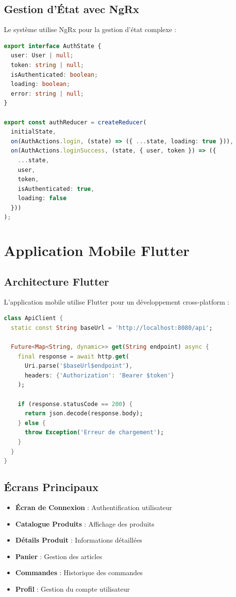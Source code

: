 \documentclass[12pt,a4paper]{report}
\begin{document}
\subsection{Gestion d'État avec NgRx}

Le système utilise NgRx pour la gestion d'état complexe :

\begin{lstlisting}[language=TypeScript, caption=Store NgRx pour l'authentification]
export interface AuthState {
  user: User | null;
  token: string | null;
  isAuthenticated: boolean;
  loading: boolean;
  error: string | null;
}

export const authReducer = createReducer(
  initialState,
  on(AuthActions.login, (state) => ({ ...state, loading: true })),
  on(AuthActions.loginSuccess, (state, { user, token }) => ({
    ...state,
    user,
    token,
    isAuthenticated: true,
    loading: false
  }))
);
\end{lstlisting}

\section{Application Mobile Flutter}

\subsection{Architecture Flutter}

L'application mobile utilise Flutter pour un développement cross-platform :

\begin{lstlisting}[language=Dart, caption=Service API Flutter]
class ApiClient {
  static const String baseUrl = 'http://localhost:8080/api';
  
  Future<Map<String, dynamic>> get(String endpoint) async {
    final response = await http.get(
      Uri.parse('$baseUrl$endpoint'),
      headers: {'Authorization': 'Bearer $token'}
    );
    
    if (response.statusCode == 200) {
      return json.decode(response.body);
    } else {
      throw Exception('Erreur de chargement');
    }
  }
}
\end{lstlisting}

\subsection{Écrans Principaux}

\begin{itemize}
    \item \textbf{Écran de Connexion} : Authentification utilisateur
    \item \textbf{Catalogue Produits} : Affichage des produits
    \item \textbf{Détails Produit} : Informations détaillées
    \item \textbf{Panier} : Gestion des articles
    \item \textbf{Commandes} : Historique des commandes
    \item \textbf{Profil} : Gestion du compte utilisateur
\end{itemize}
\end{document}
